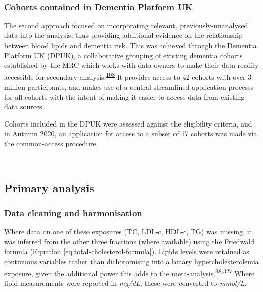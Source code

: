 \documentclass[a4paper, twoside]{templates/ociamthesis}
\begin{document}
~

\hypertarget{cohorts-contained-in-dementia-platform-uk}{%
\subsubsection{Cohorts contained in Dementia Platform UK}\label{cohorts-contained-in-dementia-platform-uk}}

The second approach focused on incorporating relevant, previously-unanalysed data into the analysis, thus providing additional evidence on the relationship between blood lipids and dementia risk. This was achieved through the Dementia Platform UK (DPUK), a collaborative grouping of existing dementia cohorts established by the MRC which works with data owners to make their data readily accessible for secondary analysis.\textsuperscript{\protect\hyperlink{ref-bauermeister2020}{108}} It provides access to 42 cohorts with over 3 million participants, and makes use of a central streamlined application processs for all cohorts with the intent of making it easier to access data from existing data sources.

Cohorts included in the DPUK were assessed against the eligibility criteria, and in Autumn 2020, an application for access to a subset of 17 cohorts was made via the common-access procedure.

~

\hypertarget{primary-analysis-1}{%
\subsection{Primary analysis}\label{primary-analysis-1}}

\hypertarget{data-cleaning-and-harmonisation}{%
\subsubsection{Data cleaning and harmonisation}\label{data-cleaning-and-harmonisation}}

Where data on one of these exposures (TC, LDL-c, HDL-c, TG) was missing, it was inferred from the other three fractions (where available) using the Friedwald formula (Equation \eqref{eq:total-cholesterol-formula}). Lipids levels were retained as continuous variables rather than dichotomising into a binary hypercholesterolemia exposure, given the additional power this adds to the meta-analysis.\textsuperscript{\protect\hyperlink{ref-riley2020}{98},\protect\hyperlink{ref-ensor2018}{327}} Where lipid measurements were reported in \emph{mg/dL}, these were converted to \emph{mmol/L}.
\end{document}
